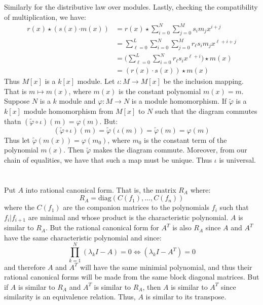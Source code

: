 \documentclass[crop=false,class=article]{standalone}                           %
\begin{document}
        Similarly for the distributive law over modules. Lastly, checking the
        compatibility of multiplication, we have:
        \begin{subequations}
            \begin{align}
                r(x)\star(s(x)\boldsymbol{\cdot}m(x))
                &=r(x)\star\sum_{i=0}^{N}\sum_{j=0}^{M}s_{i}m_{j}x^{i+j}\\
                &=\sum_{\ell=0}^{L}\sum_{i=0}^{N}\sum_{j=0}^{M}
                    r_{\ell}s_{i}m_{j}x^{\ell+i+j}\\
                &=\Big(\sum_{\ell=0}^{L}\sum_{i=0}^{N}
                    r_{\ell}s_{i}x^{\ell+i}\Big)\star{m}(x)\\
                &=(r(x)\cdot{s}(x))\star{m}(x)
            \end{align}
        \end{subequations}
        Thus $M[x]$ is a $k[x]$ module. Let $\iota:M\rightarrow{M}[x]$ be the
        inclusion mapping. That is $m\mapsto{m}(x)$, where $m(x)$ is the
        constant polynomial $m(x)=m$. Suppose $N$ is a $k$ module and
        $\varphi:M\rightarrow{N}$ is a module homomorphism. If $\tilde{\varphi}$
        is a $k[x]$ module homomorphism from $M[x]$ to $N$ such that the diagram
        commutes thatn $(\tilde{\varphi}\circ\iota)(m)=\varphi(m)$. But:
        \begin{equation}
            (\tilde{\varphi}\circ\iota)(m)
            =\tilde{\varphi}(\iota(m))
            =\tilde{\varphi}(m)
            =\varphi(m)
        \end{equation}
        Thus let $\tilde{\varphi}(m(x))=\varphi(m_{0})$, where $m_{0}$ is the
        constant term of the polynomial $m(x)$. Then $\tilde{\varphi}$ makes the
        diagram commute. Moreover, from our chain of equalities, we have that
        such a map must be unique. Thus $\iota$ is universal.
    \section{}
        Put $A$ into rational canonical form. That is, the matrix $R_{A}$ where:
        \begin{equation}
            R_{A}=\textrm{diag}(C(f_{1}),\dots,C(f_{n}))
        \end{equation}
        where the $C(f_{1})$ are the companion matrices to the polynomials
        $f_{i}$ such that $f_{i}|f_{i+1}$ are minimal and whose product is the
        characteristic polynomial. $A$ is similar to $R_{A}$. But the rational
        canonical form for $A^{T}$ is also $R_{A}$ since $A$ and $A^{T}$ have
        the same characteristic polynomial and since:
        \begin{equation}
            \prod_{k=1}^{N}(\lambda_{k}I-A)=0
            \Leftrightarrow(\lambda_{k}I-A^{T})=0
        \end{equation}
        and therefore $A$ and $A^{T}$ will have the same minimial polynomial,
        and thus their rational canonical forms will be made from the same
        block diagonal matrices. But if $A$ is similar to $R_{A}$ and
        $A^{T}$ is similar to $R_{A}$, then $A$ is similar to $A^{T}$ since
        similarity is an equivalence relation. Thus, $A$ is similar to its
        transpose.
\end{document}
